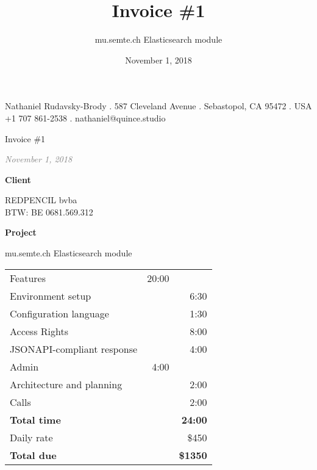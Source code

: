 \documentclass[11pt]{article}
\author{mu.semte.ch Elasticsearch module}
\date{November 1, 2018}
\title{Invoice \#1}
\begin{document}
 \thispagestyle{empty}
\centering

Nathaniel Rudavsky-Brody .
587 Cleveland Avenue . Sebastopol, CA 95472 . USA\\
+1 707 861-2538  . nathaniel@quince.studio\\

\vspace{6em}

{\Huge Invoice \#1}

\vspace{1em}

\textcolor{gray}{\textit{November 1, 2018}}

\vspace{1em}

\textbf{Client}

REDPENCIL bvba\\
BTW: BE 0681.569.312

\vspace{1em}

\textbf{Project}

 mu.semte.ch Elasticsearch module

\vspace{1em}



\begin{table}[htb]
\centering
\begin{tabular}{lrr}

\hline
Features & 20:00 & \\
\hspace*{1em} Environment setup &  & 6:30\\
\hspace*{1em} Configuration language &  & 1:30\\
\hspace*{1em} Access Rights &  & 8:00\\
\hspace*{1em} JSONAPI-compliant response &  & 4:00\\
Admin & 4:00 & \\
\hspace*{1em} Architecture and planning &  & 2:00\\
\hspace*{1em} Calls &  & 2:00\\
\hline
\textbf{Total time} & & \textbf{24:00} \\

Daily rate & & \$450 \\

\textbf{Total due} & & \textbf{\$1350} \\
\end{tabular}
\end{table}
\end{document}
